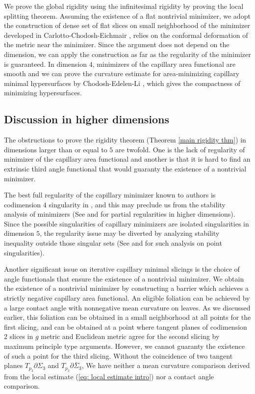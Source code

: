 \documentclass[11pt,letterpaper]{amsart}
\begin{document}
We prove the global rigidity using the infinitesimal rigidity by proving the local splitting theorem. Assuming the existence of a flat nontrivial minimizer, we adopt the construction of dense set of flat slices on small neighborhood of the minimizer developed in Carlotto-Chodosh-Eichmair \cite{carlotto2016effective}, relies on the conformal deformation of the metric near the minimizer. Since the argument does not depend on the dimension, we can apply the construction as far as the regularity of the minimizer is guaranteed. In dimension 4, minimizers of the capillary area functional are smooth and we can prove the curvature estimate for area-minimizing capillary minimal hypersurfaces by Chodosh-Edelen-Li \cite{chodosh2024improved}, which gives the compactness of minimizing hypersurfaces.

\subsection{Discussion in higher dimensions} The obstructions to prove the rigidity theorem (Theorem \ref{main rigidity thm}) in dimensions larger than or equal to $5$ are twofold. One is the lack of regularity of minimizer of the capillary area functional and another is that it is hard to find an extrinsic third angle functional that would guaranty the existence of a nontrivial minimizer.

The best full regularity of the capillary minimizer known to authors is codimension $4$ singularity in \cite{chodosh2024improved}, and this may preclude us from the stability analysis of minimizers (See \cite{firester2026area} and \cite{pacati2025some} for partial regularities in higher dimensions). Since the possible singularities of capillary minimizers are isolated singularities in dimension $5$, the regularity issue may be diverted by analyzing stability inequality outside those singular sets (See \cite{he2025positive} and \cite{cecchini2024positive} for such analysis on point singularities).

Another significant issue on iterative capillary minimal slicings is the choice of angle functionals that ensure the existence of a nontrivial minimizer. We obtain the existence of a nontrivial minimizer by constructing a barrier which achieves a strictly negative capillary area functional. An eligible foliation can be achieved by a large contact angle with nonnegative mean curvature on leaves. As we discussed earlier, this foliation can be obtained in a small neighborhood at all points for the first slicing, and can be obtained at a point where tangent planes of codimension $2$ slices in $g$ metric and Euclidean metric agree for the second slicing by maximum principle type arguments. However, we cannot guaranty the existence of such a point for the third slicing. Without the coincidence of two tangent planes $T_{p_{3}} \partial \Sigma_{3}$ and $T_{p_{3}} \partial \bar{\Sigma}_{3}$, We have neither a mean curvature comparison derived from the local estimate (\ref{eq: local estimate intro}) nor a contact angle comparison. 
\end{document}
